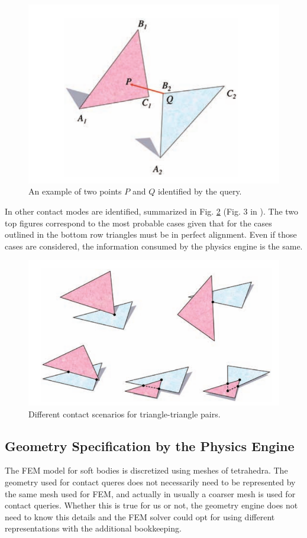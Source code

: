 \documentclass[a4paper]{article}
\begin{document}
\begin{figure}[!h]
	\centering
	\includegraphics[width=0.5\columnwidth]{figures/PQdefinition.png}
	\caption{\label{fig:pq_definition} 
	An example of two points $P$ and $Q$ identified by the query.}
\end{figure}

In \cite{bib:duriez2006_realistic_haptic_rendering} other contact modes are
identified, summarized in Fig. \ref{fig:contact_modes} (Fig. 3 in
\cite{bib:duriez2006_realistic_haptic_rendering}). The two top figures
correspond to the most probable cases given that for the cases outlined in the
bottom row triangles must be in perfect alignment. Even if those cases are
considered, the information consumed by the physics engine is the same.

\begin{figure}[!h]
	\centering
	\includegraphics[width=0.5\columnwidth]{figures/different_cases.png}
	\caption{\label{fig:contact_modes} 
	Different contact scenarios for triangle-triangle pairs.}
\end{figure}

\subsection{Geometry Specification by the Physics Engine}

The FEM model for soft bodies is discretized using meshes of tetrahedra. The
geometry used for contact queres does not necessarily need to be represented by
the same mesh used for FEM, and actually in \cite{bib:duriez2013thesis} usually
a coarser mesh is used for contact queries. Whether this is true for us or not,
the geometry engine does not need to know this details and the FEM solver could
opt for using different representations with the additional bookkeeping. 
\end{document}
